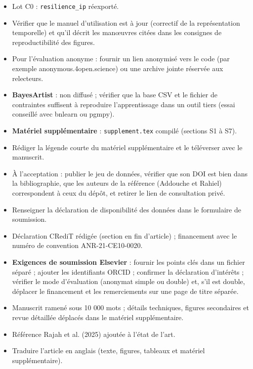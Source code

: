 {{{\begin{itemize}[leftmargin=1.2em, itemsep=1pt]
\item[$\boxtimes$] Lot C0 : \texttt{resilience\_ip} réexporté.
\item[$\square$] Vérifier que le manuel d'utilisation est à jour (correctif de la représentation temporelle) et qu'il décrit les manœuvres citées dans les consignes de reproductibilité des figures.
\item[$\square$] Pour l'évaluation anonyme : fournir un lien anonymisé vers le code (par exemple anonymous.4open.science) ou une archive jointe réservée aux relecteurs.
\item[$\square$] \textbf{BayesArtist} : non diffusé ; vérifier que la base CSV et le fichier de contraintes suffisent à reproduire l'apprentissage dans un outil tiers (essai conseillé avec bnlearn ou pgmpy).
\item[$\boxtimes$] \textbf{Matériel supplémentaire} : \texttt{supplement.tex} compilé (sections S1 à S7).
\item[$\square$] Rédiger la légende courte du matériel supplémentaire et le téléverser avec le manuscrit.
\item[$\square$] À l'acceptation : publier le jeu de données, vérifier que son DOI est bien  dans la bibliographie, que les auteurs de la référence (Addouche et Rahiel) correspondent à ceux du dépôt, et retirer le lien de consultation privé.
\item[$\square$] Renseigner la déclaration de disponibilité des données dans le formulaire de soumission.
\item[$\boxtimes$] Déclaration CRediT rédigée (section en fin d'article) ; financement avec le numéro de convention ANR-21-CE10-0020.
\item[$\square$] \textbf{Exigences de soumission Elsevier} : fournir les points clés dans un fichier séparé ; ajouter les identifiants ORCID ; confirmer la déclaration d'intérêts ; vérifier le mode d'évaluation (anonymat simple ou double) et, s'il est double, déplacer le financement et les remerciements sur une page de titre séparée.
\item[$\boxtimes$] Manuscrit ramené sous 10 000 mots ; détails techniques, figures secondaires et revue détaillée déplacés dans le matériel supplémentaire.
\item[$\boxtimes$] Référence Rajah et al. (2025) ajoutée à l'état de l'art.
\item[$\square$] Traduire l'article en anglais (texte, figures, tableaux et matériel supplémentaire).
\end{itemize}}}}
